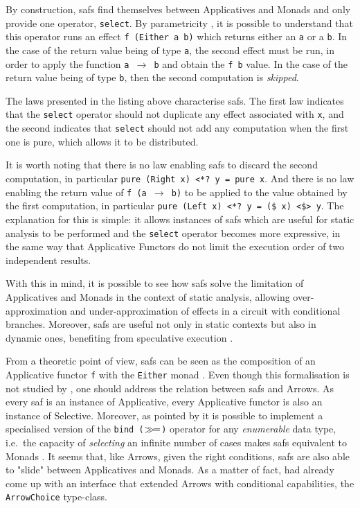 \documentclass[
  oneside,
  11pt, a4paper,
  footinclude=true,
  headinclude=true,
  cleardoublepage=empty
]{scrbook}
\theoremstyle{definition}
\theoremstyle{definition}
\def\bind{\mathbin{{>\hskip-1ex>\hskip-.4ex=}}}
\begin{document}
	By construction, \glspl{saf} find themselves between Applicatives and Monads and only provide one operator, \texttt{select}. By parametricity \citep{Wadler:1989:TF:99370.99404}, it is possible to understand that this operator runs an effect \texttt{f (Either a b)} which returns either an \texttt{a} or a \texttt{b}. In the case of the return value being of type \texttt{a}, the second effect must be run, in order to apply the function \texttt{a $\rightarrow$ b} and obtain the \texttt{f b} value. In the case of the return value being of type \texttt{b}, then the second computation is \emph{skipped}.
	            
	The laws presented in the listing above characterise \glspl{saf}. The first law indicates that the \texttt{select} operator should not duplicate any effect associated with \texttt{x}, and the second indicates that \texttt{select} should not add any computation when the first one is pure, which allows it to be distributed.
	            
	It is worth noting that there is no law enabling \glspl{saf} to discard the second computation, in particular \texttt{pure (Right x) <*? y = pure x}. And there is no law enabling the return value of \texttt{f (a $\rightarrow$ b)} to be applied to the value obtained by the first computation, in particular \texttt{pure (Left x) <*? y = (\$ x) <\$> y}. The explanation for this is simple: it allows instances of \glspl{saf} which are useful for static analysis to be performed and the \texttt{select} operator becomes more expressive, in the same way that Applicative Functors do not limit the execution order of two independent results.
	            
	With this in mind, it is possible to see how \glspl{saf} solve the limitation of Applicatives and Monads in the context of static analysis, allowing over-approximation and under-approximation of effects in a circuit with conditional branches. Moreover, \glspl{saf} are useful not only in static contexts but also in dynamic ones, benefiting from speculative execution \citep{andrey2019selective}.
	            
	From a theoretic point of view, \glspl{saf} can be seen as the composition of an Applicative functor \texttt{f} with the \texttt{Either} monad \citep{andrey2019selective}. Even though this formalisation is not studied by \cite{andrey2019selective}, one should address the relation between \glspl{saf} and Arrows.
	As every \gls{saf} is an instance of Applicative, every Applicative functor is also an instance of Selective. Moreover, as pointed by \cite{andrey2019selective} it is possible to implement a specialised version of the \texttt{bind ($\bind$)} operator for any \emph{enumerable} data type, i.e.\ the capacity of \emph{selecting} an infinite number of cases makes \glspl{saf} equivalent to Monads \citep{gist_2019}. It seems that, like Arrows, given the right conditions, \glspl{saf} are also able to "slide" between Applicatives and Monads. As a matter of fact, \cite{Hughes:2000:GMA:347238.347246} had already come up with an interface that extended Arrows with conditional capabilities, the \texttt{ArrowChoice} type-class.
	            
\end{document}
